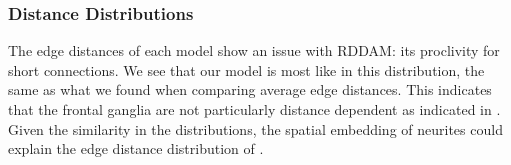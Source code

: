 \subsubsection{Distance Distributions} 
The edge distances of each model show an issue with RDDAM: its proclivity for short connections. 
We see that our model is most like \ce in this distribution, the same as what we found when comparing average edge distances. 
This indicates that the \ce frontal ganglia are not particularly distance dependent as indicated in \cite{Itzhack}. 
Given the similarity in the distributions, the spatial embedding of neurites could explain the edge distance distribution of \ce. 
